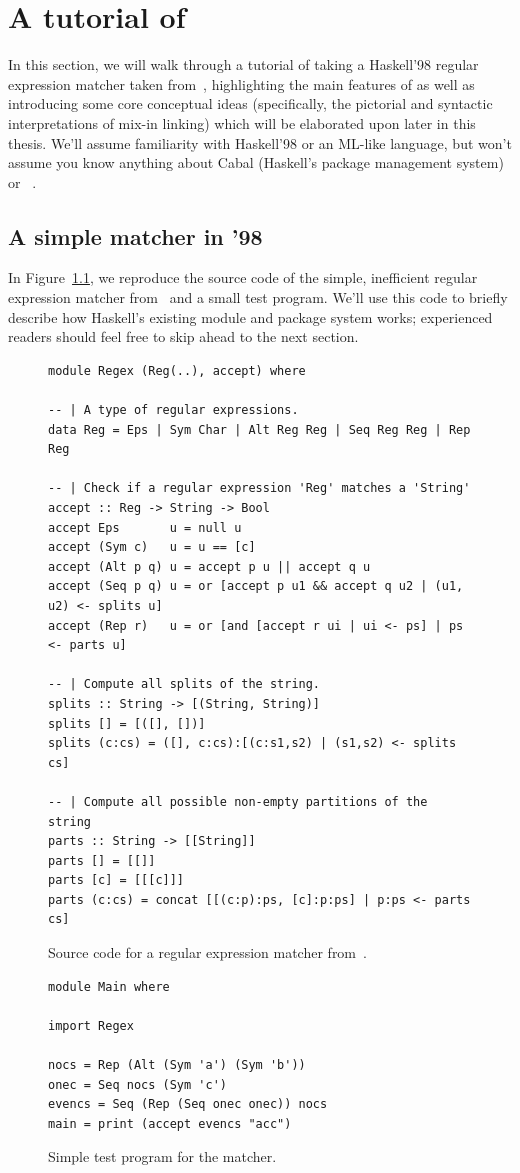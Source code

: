 \chapter{A tutorial of \Backpack{}}
\label{sec:tour}

In this section, we will walk through a tutorial of taking a Haskell'98
regular expression matcher taken
from~\cite{Fischer:2010:PRE:1863543.1863594}, highlighting the main
features of \Backpack{} as well as introducing some core conceptual
ideas (specifically, the pictorial and syntactic interpretations
of mix-in linking) which will be elaborated upon later in this thesis.  We'll assume
familiarity with Haskell'98 or an ML-like language, but won't assume you
know anything about Cabal (Haskell's package management system) or
\OldBackpack{}~\cite{backpack}.

\section{A simple matcher in '98}

In Figure~\ref{fig:matcher-haskell98}, we reproduce the source code of
the simple, inefficient regular expression matcher
from~\cite{Fischer:2010:PRE:1863543.1863594} and a small test program.
We'll use this code to briefly describe how Haskell's existing module
and package system works; experienced readers should feel free to skip
ahead to the next section.

\begin{figure}
\begin{verbatim}
module Regex (Reg(..), accept) where

-- | A type of regular expressions.
data Reg = Eps | Sym Char | Alt Reg Reg | Seq Reg Reg | Rep Reg

-- | Check if a regular expression 'Reg' matches a 'String'
accept :: Reg -> String -> Bool
accept Eps       u = null u
accept (Sym c)   u = u == [c]
accept (Alt p q) u = accept p u || accept q u
accept (Seq p q) u = or [accept p u1 && accept q u2 | (u1, u2) <- splits u]
accept (Rep r)   u = or [and [accept r ui | ui <- ps] | ps <- parts u]

-- | Compute all splits of the string.
splits :: String -> [(String, String)]
splits [] = [([], [])]
splits (c:cs) = ([], c:cs):[(c:s1,s2) | (s1,s2) <- splits cs]

-- | Compute all possible non-empty partitions of the string
parts :: String -> [[String]]
parts [] = [[]]
parts [c] = [[[c]]]
parts (c:cs) = concat [[(c:p):ps, [c]:p:ps] | p:ps <- parts cs]
\end{verbatim}
\caption{Source code for a regular expression matcher from~\cite{Fischer:2010:PRE:1863543.1863594}.}
\begin{verbatim}
module Main where

import Regex

nocs = Rep (Alt (Sym 'a') (Sym 'b'))
onec = Seq nocs (Sym 'c')
evencs = Seq (Rep (Seq onec onec)) nocs
main = print (accept evencs "acc")
\end{verbatim}
\caption{Simple test program for the matcher.}
\label{fig:matcher-haskell98}
\end{figure}

